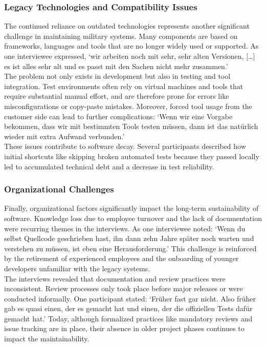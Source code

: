 \subsubsection{Legacy Technologies and Compatibility Issues}
The continued reliance on outdated technologies represents another significant challenge in maintaining military systems. Many components are based on frameworks, languages and tools that are no longer widely used or supported.
As one interviewee expressed, `wir arbeiten noch mit sehr, sehr alten Versionen, [\ldots] es ist alles sehr alt und es passt mit den Sachen nicht mehr zusammen.'\\

The problem not only exists in development but also in testing and tool integration. Test environments often rely on virtual machines and tools that require substantial manual effort, and are therefore prone for errors like misconfigurations or copy-paste mistakes.
Moreover, forced tool usage from the customer side can lead to further complications: `Wenn wir eine Vorgabe bekommen, dass wir mit bestimmten Tools testen müssen, dann ist das natürlich wieder mit extra Aufwand verbunden.'\\

These issues contribute to software decay. Several participants described how initial shortcuts like skipping broken automated tests because they passed locally led to accumulated technical debt and a decrease in test reliability.\\

\subsubsection{Organizational Challenges}
Finally, organizational factors significantly impact the long-term sustainability of software. Knowledge loss due to employee turnover and the lack of documentation were recurring themes in the interviews.
As one interviewee noted: `Wenn du selbst Quellcode geschrieben hast, ihn dann zehn Jahre später noch warten und verstehen zu müssen, ist eben eine Herausforderung.' This challenge is reinforced by the retirement of experienced employees and the onboarding of younger developers
unfamiliar with the legacy systems.\\

The interviews revealed that documentation and review practices were inconsistent. Review processes only took place before major releases or were conducted informally. One participant stated:
`Früher fast gar nicht. Also früher gab es quasi einen, der es gemacht hat und einen, der die offiziellen Tests dafür gemacht hat.' Today, although formalized practices like mandatory reviews and issue tracking are in place, their absence in older project 
phases continues to impact the maintainability. 

